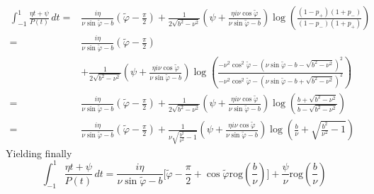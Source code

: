 \begin{equation}
\begin{split}
\int_{-1}^1 \frac{\eta t+ \psi}{P(t)}\, dt =&\frac{i\eta}{\nu\sin\tilde{\varphi}-b}(\tilde{\varphi}-\frac{\pi}{2})+\frac{1}{2\sqrt{b^2-\nu^2}}\left(\psi+\frac{\eta i\nu\cos\tilde{\varphi}}{\nu\sin\tilde{\varphi}-b}\right)\log\left(\frac{(1-p_+)(1+p_-)}{(1-p_-)(1+p_+)}\right)\\
=&\frac{i\eta}{\nu\sin\tilde{\varphi}-b}(\tilde{\varphi}-\frac{\pi}{2})\\
&+\frac{1}{2\sqrt{b^2-\nu^2}}\left(\psi+\frac{\eta i\nu\cos\tilde{\varphi}}{\nu\sin\tilde{\varphi}-b}\right)\log\left(\frac{-\nu^2\cos^2\tilde{\varphi}-(\nu\sin\tilde{\varphi}-b-\sqrt{b^2-\nu^2})^2}{-\nu^2\cos^2\tilde{\varphi}-(\nu\sin\tilde{\varphi}-b+\sqrt{b^2-\nu^2})^2}\right)\\
=&\frac{i\eta}{\nu\sin\tilde{\varphi}-b}(\tilde{\varphi}-\frac{\pi}{2})+\frac{1}{2\sqrt{b^2-\nu^2}}\left(\psi+\frac{\eta i\nu\cos\tilde{\varphi}}{\nu\sin\tilde{\varphi}-b}\right)\log\left(\frac{b+\sqrt{b^2-\nu^2}}{b-\sqrt{b^2-\nu^2}}\right)\\
=&\frac{i\eta}{\nu\sin\tilde{\varphi}-b}(\tilde{\varphi}-\frac{\pi}{2})+\frac{1}{\nu\sqrt{\frac{b^2}{\nu^2}-1}}\left(\psi+\frac{\eta i\nu\cos\tilde{\varphi}}{\nu\sin\tilde{\varphi}-b}\right)\log\left(\frac{b}{\nu}+\sqrt{\frac{b^2}{\nu^2}-1}\right)
\end{split}
\end{equation}
Yielding finally
\begin{equation}
\int_{-1}^1 \frac{\eta t+ \psi}{P(t)}\, dt =\frac{i\eta}{\nu\sin\tilde{\varphi}-b}\lbrack\tilde{\varphi}-\frac{\pi}{2}+\cos\tilde{\varphi} \mbox{rog}(\frac{b}{\nu})\rbrack+\frac{\psi}{\nu}\mbox{rog}(\frac{b}{\nu})
\label{intP}
\end{equation}